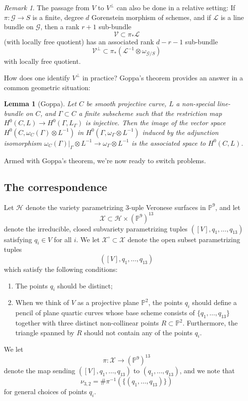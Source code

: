 \documentclass[reqno, 11pt]{amsart}
\theoremstyle{plain}
\newtheorem{lemma}[theorem]{Lemma}
\theoremstyle{remark}
\newtheorem{remark}[theorem]{Remark}
\renewcommand{\P}{\mathbb{P}}
\begin{document}
\begin{remark}
The passage from $V$ to $V^{\perp}$ can also be done
in a relative setting: If $\pi : \mathcal{G} \to S$ is a finite, degree $d$
Gorenstein morphism of schemes, and if $\mathcal{L}$ is a line bundle
on $\mathcal{G}$, then a rank $r+1$ sub-bundle
\[\mathcal{V} \subset \pi_{*}\mathcal{L}\] (with locally free
quotient) has an associated rank $d-r-1$
sub-bundle
\[\mathcal{V}^{\perp} \subset \pi_{*} \left(\mathcal{L}^{-1} \otimes
    \omega_{\mathcal{G}/S}\right)\] with locally free quotient.
\end{remark}

How does one identify $V^{\perp}$ in practice?
Goppa's theorem provides an answer 
in a common geometric situation:

\begin{lemma}[Goppa]
  \label{lemma:goppa} Let $C$ be smooth projective curve, $L$ a
  non-special line-bundle on $C$, and $\Gamma \subset C$ a finite
  subscheme such that the restriction map
  $H^{0}(C,L) \to H^{0}(\Gamma, L_{\Gamma})$ is injective.  Then the
  image of the vector space
  $H^{0}(C, \omega_{C}(\Gamma) \otimes L^{-1})$ in
  $H^{0}(\Gamma, \omega_{\Gamma} \otimes L^{-1})$ induced by the
  adjunction isomorphism
  $\omega_{C}(\Gamma)|_{\Gamma} \otimes L^{-1} \to \omega_{\Gamma} \otimes L^{-1}$ is the associated
  space to $H^{0}(C,L)$.
\end{lemma}

Armed with Goppa's theorem, we're now ready to switch problems.


\subsection{The correspondence}

Let $\mathcal{H}$ denote the variety parametrizing $3$-uple Veronese surfaces in $\P^{9}$, and let $$\mathcal{X} \subset \mathcal{H} \times (\P^{9})^{13}$$ denote the irreducible, closed subvariety parametrizing tuples $([V],q_1,\dots, q_{13})$ satisfying $q_{i} \in V$ for all $i$.  We let $\mathcal{X}^{\circ} \subset \mathcal{X}$ denote the open subset  parametrizing tuples $$\left([V], q_1, \dots, q_{13}\right)$$ which satisfy the following conditions: 

\begin{enumerate}
    \item The points $q_{i}$ should be distinct;
    \item When we think of $V$ as a projective plane $\P^{2}$, the points $q_{i}$ should define a pencil of plane quartic curves whose base scheme consists of $\{q_1, \dots, q_{13}\}$ together with three distinct non-collinear points $R \subset \P^{2}$. Furthermore, the triangle spanned by $R$  should not contain any of the points $q_{i}$. 
\end{enumerate}
We let $$\pi: \mathcal{X} \to (\P^{9})^{13}$$ denote the map sending $([V],q_1, \dots, q_{13})$ to $(q_{1}, \dots, q_{13})$, and we note that $$\nu_{3,2} = \# \pi^{-1}(\{(q_1, \dots, q_{13})\})$$ for general choices of points $q_{i}$. 
\end{document}
